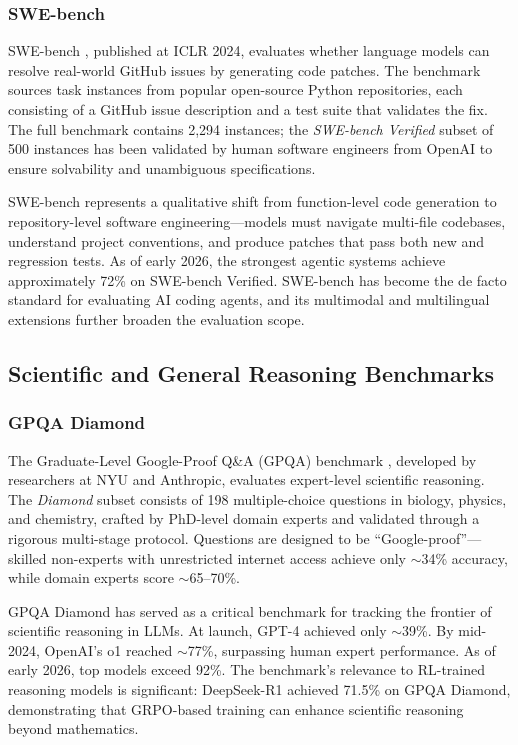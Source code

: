 \documentclass[12pt,a4paper]{report}
\theoremstyle{definition}
\begin{document}
\subsubsection{SWE-bench}

SWE-bench \cite{jimenez2024swebench}, published at ICLR 2024, evaluates whether language models can resolve real-world GitHub issues by generating code patches. The benchmark sources task instances from popular open-source Python repositories, each consisting of a GitHub issue description and a test suite that validates the fix. The full benchmark contains 2,294 instances; the \emph{SWE-bench Verified} subset of 500 instances has been validated by human software engineers from OpenAI to ensure solvability and unambiguous specifications.

SWE-bench represents a qualitative shift from function-level code generation to repository-level software engineering---models must navigate multi-file codebases, understand project conventions, and produce patches that pass both new and regression tests. As of early 2026, the strongest agentic systems achieve approximately 72\% on SWE-bench Verified. SWE-bench has become the de facto standard for evaluating AI coding agents, and its multimodal and multilingual extensions further broaden the evaluation scope.

\subsection{Scientific and General Reasoning Benchmarks}

\subsubsection{GPQA Diamond}

The Graduate-Level Google-Proof Q\&A (GPQA) benchmark \cite{rein2024gpqa}, developed by researchers at NYU and Anthropic, evaluates expert-level scientific reasoning. The \emph{Diamond} subset consists of 198 multiple-choice questions in biology, physics, and chemistry, crafted by PhD-level domain experts and validated through a rigorous multi-stage protocol. Questions are designed to be ``Google-proof''---skilled non-experts with unrestricted internet access achieve only $\sim$34\% accuracy, while domain experts score $\sim$65--70\%.

GPQA Diamond has served as a critical benchmark for tracking the frontier of scientific reasoning in LLMs. At launch, GPT-4 achieved only $\sim$39\%. By mid-2024, OpenAI's o1 reached $\sim$77\%, surpassing human expert performance. As of early 2026, top models exceed 92\%. The benchmark's relevance to RL-trained reasoning models is significant: DeepSeek-R1 achieved 71.5\% on GPQA Diamond, demonstrating that GRPO-based training can enhance scientific reasoning beyond mathematics.
\end{document}
